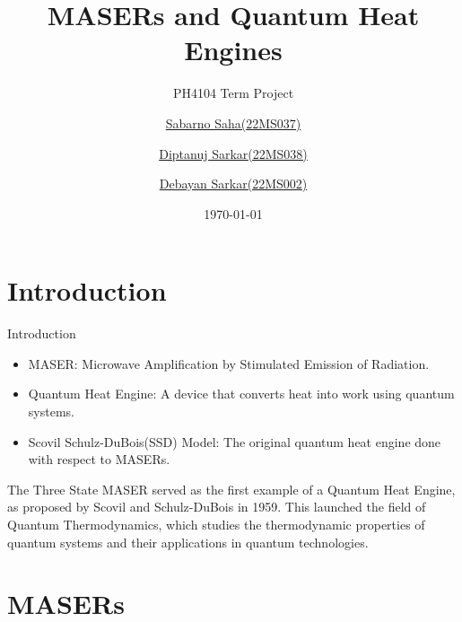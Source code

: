\documentclass{beamer}
\title{MASERs and Quantum Heat Engines}
\subtitle{PH4104 Term Project}
\author{\scriptsize \href{}{Sabarno Saha(22MS037)} \and \href{}{Diptanuj Sarkar(22MS038)} \and \href{}{Debayan Sarkar(22MS002)}}
\date{\today}
\begin{document}
    \maketitle
    \section{Introduction}
    \begin{frame}{Introduction}
        \begin{itemize}
            \item MASER: Microwave Amplification by Stimulated Emission of Radiation. \pause
            \item Quantum Heat Engine: A device that converts heat into work using quantum systems. \pause 
            \item Scovil Schulz-DuBois(SSD) Model: The original quantum heat engine done with respect to MASERs.
        \end{itemize}
        \pause

        The Three State MASER served as the first example of a Quantum Heat Engine, as proposed by Scovil and Schulz-DuBois in 1959. This launched the field of Quantum Thermodynamics, which studies the thermodynamic properties of quantum systems and their applications in quantum technologies. 
       
    \end{frame} 

    \section{MASERs}
\end{document}
